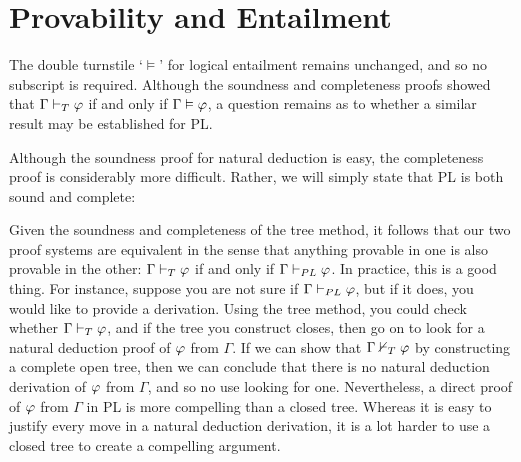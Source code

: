 \section{Provability and Entailment}

The double turnstile `$\models$' for logical entailment remains unchanged, and so no subscript is required.
Although the soundness and completeness proofs showed that $\Gamma \vdash_{T} \varphi$ if and only if $\Gamma \vDash \varphi$, a question remains as to whether a similar result may be established for PL.

Although the soundness proof for natural deduction is easy, the completeness proof is considerably more difficult.
Rather, we will simply state that PL is both sound and complete:


Given the soundness and completeness of the tree method, it follows that our two proof systems are equivalent in the sense that anything provable in one is also provable in the other: $\Gamma\vdash_{T}\varphi$ if and only if $\Gamma\vdash_{PL}\varphi$.
In practice, this is a good thing.
For instance, suppose you are not sure if $\Gamma \vdash_{PL} \varphi$, but if it does, you would like to provide a derivation.
Using the tree method, you could check whether $\Gamma \vdash_{T} \varphi$, and if the tree you construct closes, then go on to look for a natural deduction proof of $\varphi$ from $\Gamma$. 
If we can show that $\Gamma \nvdash_{T} \varphi$ by constructing a complete open tree, then we can conclude that there is no natural deduction derivation of $\varphi$ from $\Gamma$, and so no use looking for one. 
Nevertheless, a direct proof of $\varphi$ from $\Gamma$ in PL is more compelling than a closed tree.
Whereas it is easy to justify every move in a natural deduction derivation, it is a lot harder to use a closed tree to create a compelling argument.

